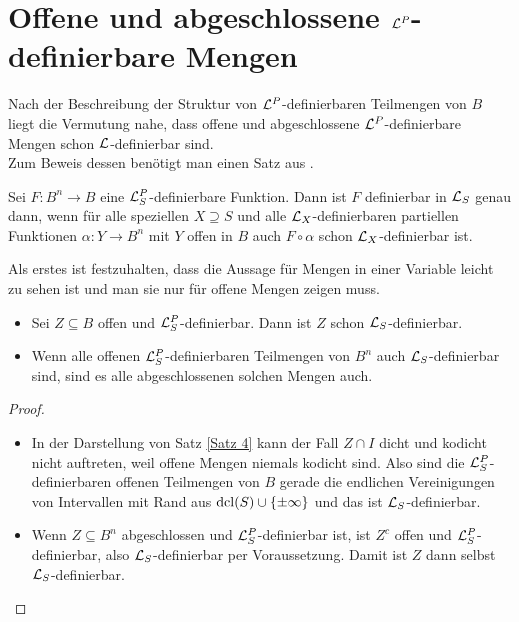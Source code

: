 \section{Offene und abgeschlossene $\mathcal{L}^P$-definierbare Mengen}
Nach der Beschreibung der Struktur von $\mathcal{L}^P$-definierbaren Teilmengen von $B$ liegt die Vermutung nahe, dass offene und abgeschlossene $\mathcal{L}^P$-definierbare Mengen schon $\mathcal{L}$-definierbar sind.\\
Zum Beweis dessen benötigt man einen Satz aus \cite{Piz}.
\begin{theorem}\label{Kurven}
	Sei $F:B^n\rightarrow B$ eine $\mathcal{L}^P_S$-definierbare Funktion. Dann ist $F$ definierbar in $\mathcal{L}_S$ genau dann, wenn für alle speziellen $X\supseteq S$ und alle $\mathcal{L}_X$-definierbaren partiellen Funktionen $\alpha: Y\rightarrow B^n$ mit $Y$ offen in $B$ auch $F\circ\alpha$ schon $\mathcal{L}_X$-definierbar ist.
\end{theorem}

Als erstes ist festzuhalten, dass die Aussage für Mengen in einer Variable leicht zu sehen ist und man sie nur für offene Mengen zeigen muss.
\begin{lemma}
	\begin{itemize}
		\item Sei $Z\subseteq B$ offen und $\mathcal{L}^P_S$-definierbar. Dann ist $Z$ schon $\mathcal{L}_S$-definierbar.
		\item Wenn alle offenen $\mathcal{L}^P_S$-definierbaren Teilmengen von $B^n$ auch $\mathcal{L}_S$-definierbar sind, sind es alle abgeschlossenen solchen Mengen auch.
	\end{itemize}
\end{lemma}
\begin{proof}
	\begin{itemize}
		\item In der Darstellung von Satz \ref{Satz 4} kann der Fall $Z\cap I$ dicht und kodicht nicht auftreten, weil offene Mengen niemals kodicht sind. Also sind die $\mathcal{L}^P_S$-definierbaren offenen Teilmengen von $B$ gerade die endlichen Vereinigungen von Intervallen mit Rand aus $\operatorname{dcl}(S)\cup\{\pm\infty\}$ und das ist $\mathcal{L}_S$-definierbar.
		\item Wenn $Z\subseteq B^n$ abgeschlossen und $\mathcal{L}^P_S$-definierbar ist, ist $Z^c$ offen und $\mathcal{L}^P_S$-definierbar, also $\mathcal{L}_S$-definierbar per Voraussetzung. Damit ist $Z$ dann selbst $\mathcal{L}_S$-definierbar.
	\end{itemize}
\end{proof}

